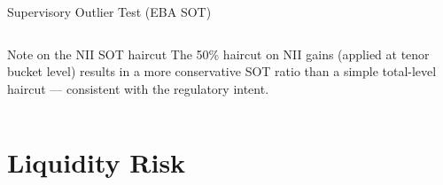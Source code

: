 \documentclass[aspectratio=169,10pt]{beamer}
\begin{document}
\begin{frame}{Supervisory Outlier Test (EBA SOT)}
\begin{columns}[T]
      \vspace{6pt}
      \normalsize
      \begin{block}{Note on the NII SOT haircut}
        \small The 50\% haircut on NII gains (applied at tenor bucket level)
        results in a more conservative SOT ratio than a simple
        total-level haircut — consistent with the regulatory intent.
      \end{block}
  \end{columns}
\end{frame}

\section{Liquidity Risk}
\end{document}
